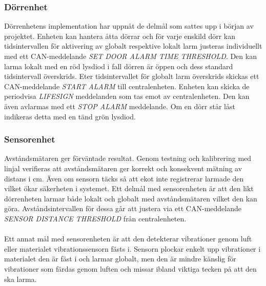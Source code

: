 \documentclass{article}
\begin{document}
\subsubsection{Dörrenhet}
Dörrenhetens implementation har uppnåt de delmål som sattes upp i början av projektet. 
Enheten kan hantera åtta dörrar och för varje enskild dörr kan tidsintervallen för aktivering av globalt respektive lokalt larm justeras individuellt med ett CAN-meddelande \emph{SET DOOR ALARM TIME THRESHOLD}. 
Den kan larma lokalt med en röd lysdiod i fall dörren är öppen och dess standard tidsintervall överskrids.
Eter tidsintervallet för globalt larm överskrids skickas ett CAN-meddelande \emph{START ALARM} till centralenheten.
Enheten kan skicka de periodvisa \emph{LIFESIGN} meddelanden som tas emot av centralenheten.
Den kan även avlarmas med ett \emph{STOP ALARM} meddelande. 
Om en dörr står låst indikeras detta med en tänd grön lysdiod.

\subsubsection{Sensorenhet}
Avståndsmätaren ger förväntade resultat.
Genom testning och kalibrering med linjal verifieras att avståndsmätaren ger korrekt och konsekvent mätning av distans i cm.
Även om sensorn täcks så att ekot inte registrerar larmade den vilket ökar säkerheten i systemet. 
Ett delmål med sensorenheten är att den likt dörrenheten larmar både lokalt och globalt med avståndsmätaren vilket den kan göra. 
Avståndsintervallen för dessa går att justera via ett CAN-meddelande \emph{SENSOR DISTANCE THRESHOLD} från centralenheten.\\
\\
Ett annat mål med sensorenheten är att den detekterar vibrationer genom luft eller materialet vibrationssensorn fästs i. Sensorn plockar enkelt upp vibrationer i materialet den är fäst i och larmar globalt, men den är mindre känslig för vibrationer som färdas genom luften och missar ibland viktiga tecken på att den ska larma.
\end{document}
